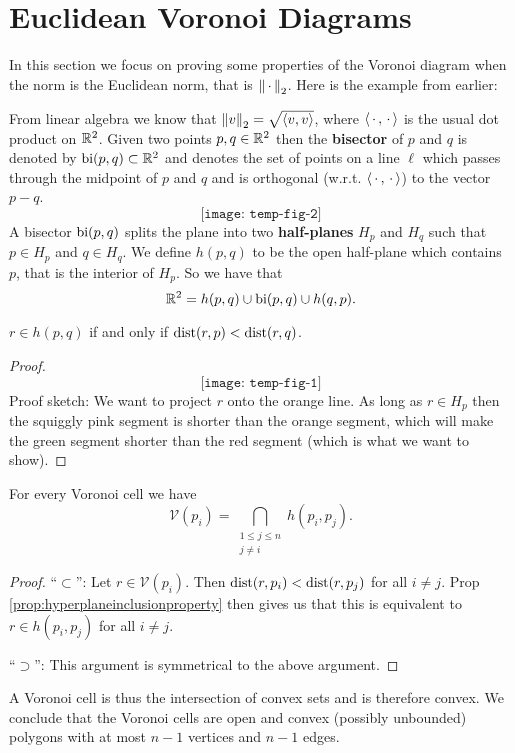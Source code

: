\section{Euclidean Voronoi Diagrams}
In this section we focus on proving some properties of the Voronoi diagram when the norm is the Euclidean norm, that is $\left\lVert \,\cdot\, \right\rVert_2$. Here is the example from earlier:
\begin{figure}[H]
    \centering
\end{figure}
From linear algebra we know that $\left\lVert v \right\rVert_2 = \sqrt{\left\langle v, v \right\rangle}$, where $\left\langle \,\cdot\,, \,\cdot\, \right\rangle$ is the usual dot product on $\mathbb{R}^2$. Given two points $p, q \in \mathbb{R}^2$ then the \textbf{bisector} of $p$ and $q$ is denoted by $\operatorname{bi}(p, q) \subset \mathbb{R}^2$ and denotes the set of points on a line $\ell$ which passes through the midpoint of $p$ and $q$ and is orthogonal (w.r.t. $\left\langle \,\cdot\,, \,\cdot\, \right\rangle$) to the vector $p - q$.
\[
    \texttt{[image: temp-fig-2]}
\]
A bisector $\operatorname{bi}(p, q)$ splits the plane into two \textbf{half-planes} $H_p$ and $H_q$ such that $p \in H_p$ and $q \in H_q$. We define $h(p, q)$ to be the open half-plane which contains $p$, that is the interior of $H_p$. So we have that
\[
    \mathbb{R}^2 = h(p, q) \cup \operatorname{bi}(p, q) \cup h(q, p).
\]
\begin{prop} \label{prop:hyperplaneinclusionproperty}
$r \in h(p, q)$ if and only if $\operatorname{dist}(r, p) < \operatorname{dist}(r, q)$.
\end{prop}
\begin{proof}
\[
    \texttt{[image: temp-fig-1]}
\]
 Proof sketch: We want to project $r$ onto the orange line. As long as $r \in H_p$ then the squiggly pink segment is shorter than the orange segment, which will make the green segment shorter than the red segment (which is what we want to show).
\end{proof}

\begin{cor} \label{prop:cellsareintersectionsofhalfplanes}
For every Voronoi cell we have
\[
    \mathcal{V}(p_i) = \bigcap_{\substack{1 \leq j \leq n \\ j \ne i}} h(p_i, p_j).
\]
\end{cor}
\begin{proof}
``$\subset$'': Let $r \in \mathcal{V}(p_i)$. Then $\operatorname{dist}(r, p_i) < \operatorname{dist}(r, p_j)$ for all $i \ne j$. Prop \ref{prop:hyperplaneinclusionproperty} then gives us that this is equivalent to $r \in h(p_i, p_j)$ for all $i \ne j$.

``$\supset$'': This argument is symmetrical to the above argument.
\end{proof}
A Voronoi cell is thus the intersection of convex sets and is therefore convex. We conclude that the Voronoi cells are open and convex (possibly unbounded) polygons with at most $n - 1$ vertices and $n - 1$ edges. \\

